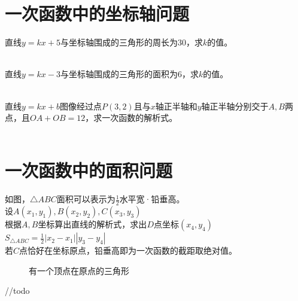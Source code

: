 \section{一次函数中的坐标轴问题}
\begin{problem}
直线$y=kx+5$与坐标轴围成的三角形的周长为30，求$k$的值。\\
\\
\end{problem}
\begin{problem}
直线$y=kx-3$与坐标轴围成的三角形的面积为6，求$k$的值。\\
\\
\end{problem}
\begin{problem}
直线$y=kx+b$图像经过点$P(3,2)$且与$x$轴正半轴和$y$轴正半轴分别交于$A,B$两点，且$OA+OB=12$，求一次函数的解析式。\\
\\
\end{problem}
\clearpage
\section{一次函数中的面积问题}
\begin{theorem}
    如图，$\triangle ABC$面积可以表示为$\frac{1}{2}$水平宽·铅垂高。\\
    设$A(x_1,y_1),B(x_2,y_2),C(x_3,y_3)$ \\
    根据$A,B$坐标算出直线的解析式，求出$D$点坐标$(x_4,y_4)$ \\
    $S_{\triangle ABC}=\frac{1}{2}|x_2-x_1||y_3-y_4|$ \\
    若$C$点恰好在坐标原点，铅垂高即为一次函数的截距取绝对值。
\end{theorem}
\begin{figure}[ht]
    \centering
    \begin{minipage}[t]{0.48\textwidth}
        \centering
        \resizebox{4cm}{!}{}
        \caption{铅垂法}
    \end{minipage}
    \hfill
    \begin{minipage}[t]{0.48\textwidth}
        \centering
        \resizebox{4cm}{!}{}
        \caption{有一个顶点在原点的三角形}
    \end{minipage}
\end{figure}
\begin{problem}
//todo
\end{problem}
\clearpage
